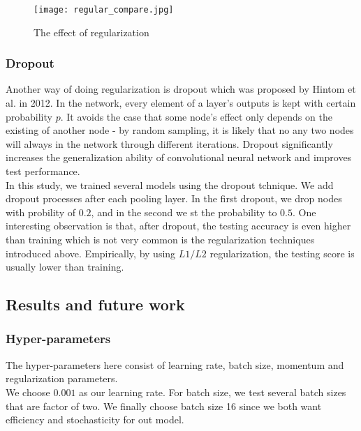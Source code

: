 \documentclass[paper=a4, fontsize=11pt]{scrartcl} %
\numberwithin{equation}{section} %
\numberwithin{figure}{section} %
\numberwithin{table}{section} %
\begin{document}
\begin{figure}[!t]%
  \centering
  \texttt{[image: regular\_compare.jpg]}
  \caption{The effect of regularization}
  \label{fig:test}
\end{figure} 
\newpage
\subsubsection{\textbf{Dropout}}
Another way of doing regularization is dropout which was proposed by Hintom et al. in 2012. In the network, every element of a layer's outputs is kept with certain probability $p$. It avoids the case that some node's effect only depends on the existing of another node - by random sampling, it is likely that no any two nodes will always in the network through different iterations. Dropout significantly increases the generalization ability of convolutional neural network and improves test performance. \\

In this study, we trained several models using the dropout tchnique. We add dropout processes after each pooling layer. In the first dropout, we drop nodes with probility of $0.2$, and in the second we st the probability to $0.5$. One interesting observation is that, after dropout, the testing accuracy is even higher than training which is not very common is the regularization techniques introduced above. Empirically, by using $L1/L2$ regularization, the testing score is usually lower than training.


\subsection{\textbf{Results and future work}}
\subsubsection{Hyper-parameters}
The hyper-parameters here consist of learning rate, batch size, momentum and regularization parameters. \\

We choose $0.001$ as our learning rate. For batch size, we test several batch sizes that are factor of two. We finally choose batch size 16 since we both want efficiency and stochasticity for out model. \\
\end{document}
